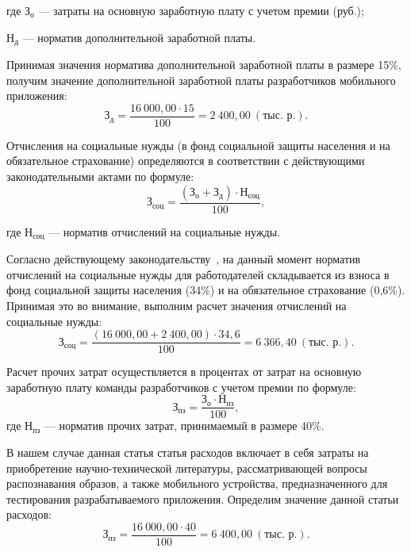 \noindent где
\( \text{З}_{\text{о}} \)
--- затраты на основную заработную плату с учетом премии (руб.); \par
\noindent \hspace{6.5mm} \( \text{Н}_{\text{д}} \)
--- норматив дополнительной заработной платы.

Принимая значения норматива дополнительной заработной платы в размере 15\%,
получим значение дополнительной заработной платы разработчиков
мобильного приложения:
\begin{equation*}
  \text{З}_{\text{д}} =
  \dfrac{16 \: 000{,}00 \cdot 15}{100} = 2 \: 400{,}00 \: (\text{тыс.~р.}).
\end{equation*}

Отчисления на социальные нужды (в фонд социальной защиты
населения и на обязательное страхование) определяются в соответствии с
действующими законодательными актами по формуле:
\begin{equation*}
  \text{З}_{\text{соц}} =
  \dfrac{(\text{З}_{\text{о}} + \text{З}_{\text{д}}) \cdot \text{Н}_{\text{соц}}}{100},
\end{equation*}

\noindent где
\( \text{Н}_{\text{соц}} \)
--- норматив отчислений на социальные нужды.

Согласно действующему законодательству~\cite{law_social_royalties},
на данный момент норматив отчислений на социальные нужды для работодателей
складывается из взноса в фонд социальной защиты населения (34\%) и на обязательное
страхование (0,6\%). Принимая это во внимание, выполним расчет значения
отчислений на социальные нужды:
\begin{equation*}
  \text{З}_{\text{соц}} =
  \dfrac{(16 \: 000{,}00 + 2 \: 400{,}00) \cdot 34{,}6}{100} = 6 \: 366{,}40 \: (\text{тыс.~р.}).
\end{equation*}

Расчет прочих затрат осуществляется в процентах от затрат на основную
заработную плату команды разработчиков с учетом премии по формуле:
\begin{equation*}
  \text{З}_{\text{пз}} =
  \dfrac{\text{З}_{\text{о}} \cdot \text{Н}_{\text{пз}}}{100},
\end{equation*}
\noindent где
\( \text{Н}_{\text{пз}} \)
--- норматив прочих затрат, принимаемый в размере 40\%.

В нашем случае данная статья статья расходов включает в себя затраты на приобретение
научно-технической литературы, рассматривающей вопросы распознавания образов,
а также мобильного устройства, предназначенного
для тестирования разрабатываемого приложения.
Определим значение данной статьи расходов:
\begin{equation*}
  \text{З}_{\text{пз}} =
  \dfrac{16 \: 000{,}00 \cdot 40}{100} = 6 \: 400{,}00 \: (\text{тыс.~р.}).
\end{equation*}

